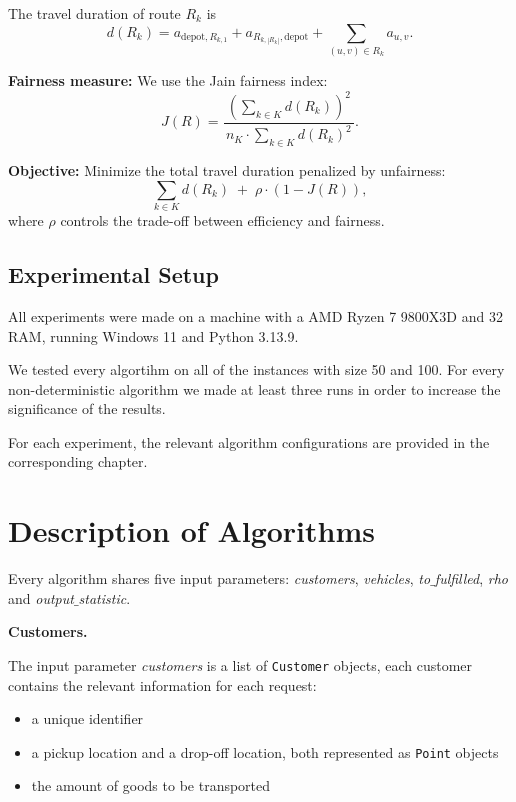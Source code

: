 \documentclass[12pt]{article}
\begin{document}
\begin{mdframed}[
    linecolor=black,
    linewidth=1.5pt,
    roundcorner=5pt,
    backgroundcolor=blue!5,
    userdefinedwidth=\textwidth,
]
The travel duration of route $R_k$ is
\[
d(R_k)
= a_{\text{depot}, R_{k,1}}
+ a_{R_{k,|R_k|}, \text{depot}}
+ \sum_{(u,v)\in R_k} a_{u,v}.
\]

\vspace{0.5em}
\textbf{Fairness measure:}  
We use the Jain fairness index:
\[
J(R)
=
\frac{\left(\sum_{k \in K} d(R_k)\right)^2}
{\,n_K \cdot \sum_{k \in K} d(R_k)^2\, }.
\]

\vspace{0.7em}
\textbf{Objective:}  
Minimize the total travel duration penalized by unfairness:
\[
\sum_{k \in K} d(R_k)
\;+\;
\rho \cdot (1 - J(R)),
\]
where $\rho$ controls the trade-off between efficiency and fairness.

\end{mdframed}

\subsection{Experimental Setup}
All experiments were made on a machine with a AMD Ryzen 7 9800X3D and 32 RAM, running Windows 11 and Python 3.13.9.

We tested every algortihm on all of the instances with size 50 and 100. For every non-deterministic algorithm we made at least three runs in order to increase the significance of the results.

For each experiment, the relevant algorithm configurations are provided in the corresponding chapter.

\section{Description of Algorithms}

Every algorithm shares five input parameters: \emph{customers}, \emph{vehicles}, \emph{to$\_$fulfilled}, \emph{rho} and \emph{output$\_$statistic}. 

\vspace{0.6em}
\textbf{Customers.}

The input parameter \emph{customers} is a list of \texttt{Customer} objects, each customer contains the relevant information for each request:

\begin{itemize}
    \item a unique identifier
    \item a pickup location and a drop-off location, both represented as \texttt{Point} objects
    \item the amount of goods to be transported
\end{itemize}
\end{document}
